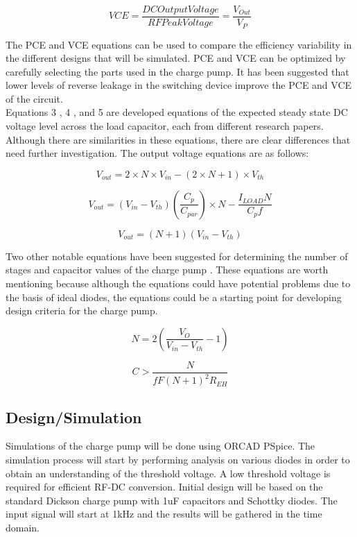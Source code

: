\documentclass[12pt]{article}
\begin{document}
\begin{equation}
VCE = \frac{DC Output Voltage}{RF Peak Voltage} = \frac{V_{Out}}{V_{P}}\label{eq:VCE}
\end{equation}

	\noindent The PCE and VCE equations can be used to compare the efficiency variability in the different designs that will be simulated. PCE and VCE can be optimized by carefully selecting the parts used in the charge pump. It has been suggested that lower levels of reverse leakage in the switching device improve the PCE and VCE of the circuit.\\
	
	\noindent Equations 3 \cite{Vyas}, 4 \cite{Guler}, and 5 \cite{Vinco} are developed equations of the expected steady state DC voltage level across the load capacitor, each from different research papers. Although there are similarities in these equations, there are clear differences that need further investigation. The output voltage equations are as follows:
	
\begin{equation}
V_{out} = 2\times N\times V_{in} - (2\times N + 1)\times V_{th}
\end{equation}

\begin{equation}
V_{out} = (V_{in} - V_{th})(\frac{C_p}{C_{par}})\times N - \frac{I_{LOAD}N}{C_pf}
\end{equation}

\begin{equation}
V_{out} = (N + 1)(V_{in} - V_{th})
\end{equation}

	\noindent Two other notable equations have been suggested for determining the number of stages and capacitor values of the charge pump \cite{Vinco}. These equations are worth mentioning because although the equations could have potential problems due to the basis of ideal diodes, the equations could be a starting point for developing design criteria for the charge pump.

\begin{equation}
N = 2(\frac{V_O}{V_{in}-V_{th}}-1)
\end{equation}

\begin{equation}
C > \frac{N}{fF(N+1)^2R_{EH}}
\end{equation}

	\subsection{Design/Simulation}
	Simulations of the charge pump will be done using ORCAD PSpice. The simulation process will start by performing analysis on various diodes in order to obtain an understanding of the threshold voltage. A low threshold voltage is required for efficient RF-DC conversion. Initial design will be based on the standard Dickson charge pump with 1uF capacitors and Schottky diodes. The input signal will start at 1kHz and the results will be gathered in the time domain.\\
	
\end{document}
